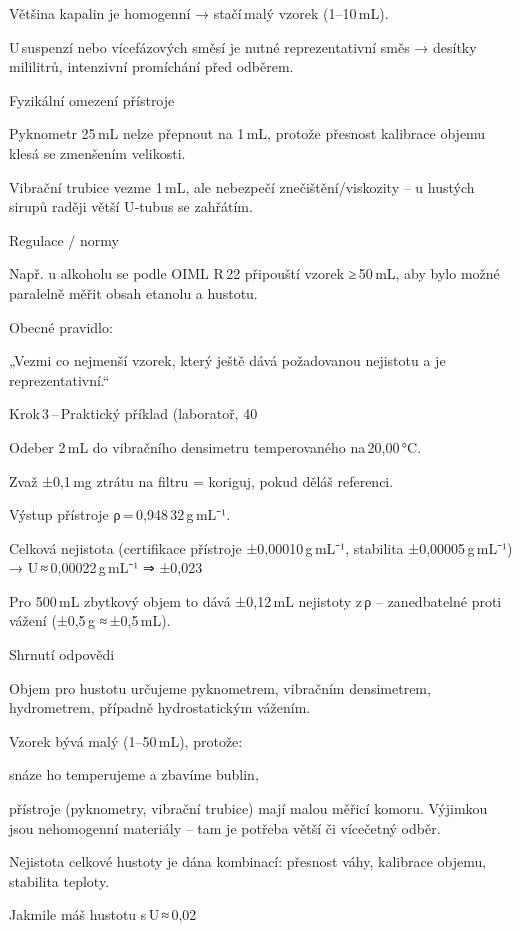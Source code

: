         Většina kapalin je homogenní → stačí malý vzorek (1–10 mL).

        U suspenzí nebo vícefázových směsí je nutné reprezentativní směs → desítky mililitrů, intenzivní promíchání před odběrem.

    Fyzikální omezení přístroje

        Pyknometr 25 mL nelze přepnout na 1 mL, protože přesnost kalibrace objemu klesá se zmenšením velikosti.

        Vibrační trubice vezme 1 mL, ale nebezpečí znečištění/viskozity – u hustých sirupů raději větší U‑tubus se zahřátím.

    Regulace / normy

        Např. u alkoholu se podle OIML R 22 připouští vzorek ≥ 50 mL, aby bylo možné paralelně měřit obsah etanolu a hustotu.

Obecné pravidlo:

    „Vezmi co nejmenší vzorek, který ještě dává požadovanou nejistotu a je reprezentativní.“

Krok 3 – Praktický příklad (laboratoř, 40 %

    Odeber 2 mL do vibračního densimetru temperovaného na 20,00 °C.

    Zvaž ±0,1 mg ztrátu na filtru = koriguj, pokud děláš referenci.

    Výstup přístroje ρ = 0,948 32 g mL⁻¹.

    Celková nejistota (certifikace přístroje ±0,00010 g mL⁻¹, stabilita ±0,00005 g mL⁻¹) → U ≈ 0,00022 g mL⁻¹ ⇒ ±0,023 %

    Pro 500 mL zbytkový objem to dává ±0,12 mL nejistoty z ρ – zanedbatelné proti vážení (±0,5 g ≈ ±0,5 mL).

Shrnutí odpovědi

    Objem pro hustotu určujeme pyknometrem, vibračním densimetrem, hydrometrem, případně hydrostatickým vážením.

    Vzorek bývá malý (1–50 mL), protože:

        snáze ho temperujeme a zbavíme bublin,

        přístroje (pyknometry, vibrační trubice) mají malou měřicí komoru.
        Výjimkou jsou nehomogenní materiály – tam je potřeba větší či vícečetný odběr.

    Nejistota celkové hustoty je dána kombinací: přesnost váhy, kalibrace objemu, stabilita teploty.

    Jakmile máš hustotu s U ≈ 0,02 %

